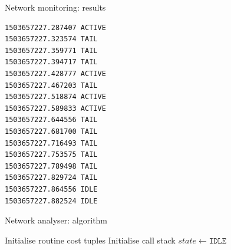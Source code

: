 %
%
\begin{frame}[fragile]{Network monitoring: results}
\begin{lstlisting}
1503657227.287407 ACTIVE
1503657227.323574 TAIL
1503657227.359771 TAIL
1503657227.394717 TAIL
1503657227.428777 ACTIVE
1503657227.467203 TAIL
1503657227.518874 ACTIVE
1503657227.589833 ACTIVE
1503657227.644556 TAIL
1503657227.681700 TAIL
1503657227.716493 TAIL
1503657227.753575 TAIL
1503657227.789498 TAIL
1503657227.829724 TAIL
1503657227.864556 IDLE
1503657227.882524 IDLE
\end{lstlisting}
\end{frame}
%
%
\begin{frame}{Network analyser: algorithm}
\begin{small}
\begin{algorithm}[H]
Initialise routine cost tuples\;
Initialise call stack\;
$state \leftarrow \texttt{IDLE}$\;
\end{algorithm}
\end{small}
\end{frame}
%
%


